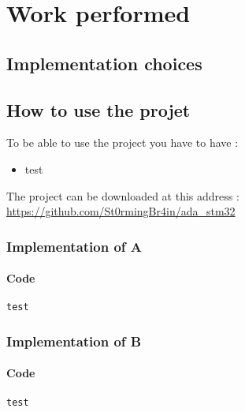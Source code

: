 \section{Work performed}

\subsection{Implementation choices}

\subsection{How to use the projet}

To be able to use the project you have to have :
\begin{itemize}
    \item test
\end{itemize}

\begin{noindent}
The project can be downloaded at this address : \\
\url{https://github.com/St0rmingBr4in/ada_stm32}
\end{noindent}

\newpage

\subsubsection{Implementation of A}

\paragraph{Code}
\noindent
\begin{centering}


\begin{lstlisting}
test
\end{lstlisting}
\end{centering}
\newpage

\subsubsection{Implementation of B}

\paragraph{Code}
\noindent
\begin{centering}


\begin{lstlisting}
test
\end{lstlisting}
\end{centering}
\newpage
